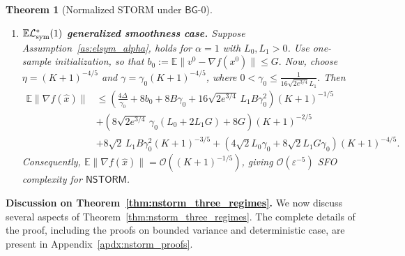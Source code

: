 \documentclass[letter,11pt]{article}
\newtheorem{theorem}{Theorem}[]
\newcommand{\E}{\mathbb{E}}
\newcommand{\Ocal}{\mathcal{O}}
\newcommand{\Lcal}{\mathcal{L}}
\begin{document}
\begin{theorem}[Normalized STORM under $\mathsf{BG}$-0]
\begin{enumerate}[label=(\roman*), leftmargin=*]
\[\begin{aligned}
\right]
T^{-\frac{1+\alpha}{4+\alpha}}
+
8\sqrt{\eta_0}GT^{-\frac{2}{4+\alpha}}
\\
&  +
\frac{
    8K_2\gamma_0^{\frac{1}{1-\alpha}}
}{\sqrt{\eta_0}}
T^{-\frac{1+3\alpha}{(1-\alpha)(4+\alpha)}}
+
2K_0\gamma_0T^{-\frac{3+\alpha}{4+\alpha}}
+
2(1-\alpha)\alpha^{\frac{\alpha}{1-\alpha}}
2^{\alpha/2}K_1\gamma_0
\lambda_0^{-\frac{\alpha}{1-\alpha}}
T^{-\frac{3}{4+\alpha}}
\\
&
+
4K_2\gamma_0^{\frac{1}{1-\alpha}}
T^{-\frac{3+\alpha}{(1-\alpha)(4+\alpha)}}
+
2^{1+\alpha/2}K_1G^\alpha\gamma_0
T^{-\frac{3+\alpha}{4+\alpha}}
+
2^{1+\alpha/2}K_1B^\alpha\gamma_0^{1+\alpha}
T^{-\frac{3}{4+\alpha}}.
\end{aligned}
\]
Since $\alpha\in(0,1)$ is fixed, every decay exponent on the right-hand side is at least $\frac{1}{(4+\alpha)}$.
Consequently, $\E\|\nabla f(\widehat x)\| = \Ocal\left(T^{-1/(4+\alpha)}\right)$, giving $\Ocal(\varepsilon^{-(4+\alpha)})$ SFO complexity for $\mathsf{NSTORM}$.
\item \textbf{$\E\Lcal^*_{\rm sym}(1)$ generalized smoothness case.} 
Suppose Assumption~\ref{as:elsym_alpha}, holds for $\alpha=1$ with $L_0, L_1 >0$. Use one-sample initialization, so that $ b_0:=\E\|v^0-\nabla f(x^0)\|\le G.$ Now, choose $\eta=(K+1)^{-4/5}$ and $\gamma=\gamma_0(K+1)^{-4/5}$, where $0<\gamma_0\le \frac{1}{16\sqrt{2e^{3/4}}L_1}.$ Then
\begin{equation*}
    \begin{aligned}
    \E\|\nabla f(\widehat x)\| &\le
    \left( \frac{4\Delta}{\gamma_0} + 8b_0 + 8B\gamma_0
    + 16\sqrt{2e^{3/4}}\,L_1B\gamma_0^2 \right)(K+1)^{-1/5}
    \\
    &+
    \left( 8\sqrt{2e^{3/4}}\,\gamma_0(L_0+2L_1G) + 8G \right)(K+1)^{-2/5}
    \\
    &+
    8\sqrt2\,L_1B\gamma_0^2(K+1)^{-3/5} + \left( 4\sqrt2L_0\gamma_0
    +8\sqrt2L_1G\gamma_0 \right)(K+1)^{-4/5}.
    \end{aligned}
\end{equation*}
Consequently, $\E\|\nabla f(\widehat x)\| = \Ocal((K+1)^{-1/5})$, giving $\Ocal(\varepsilon^{-5})$ SFO complexity for $\mathsf{NSTORM}$.
\end{enumerate}
\end{theorem}

\textbf{Discussion on Theorem~\ref{thm:nstorm_three_regimes}.} We now discuss several aspects of Theorem~\ref{thm:nstorm_three_regimes}. The complete details of the proof, including the proofs on bounded variance and deterministic case, are present in Appendix~\ref{apdx:nstorm_proofs}.
\end{document}
